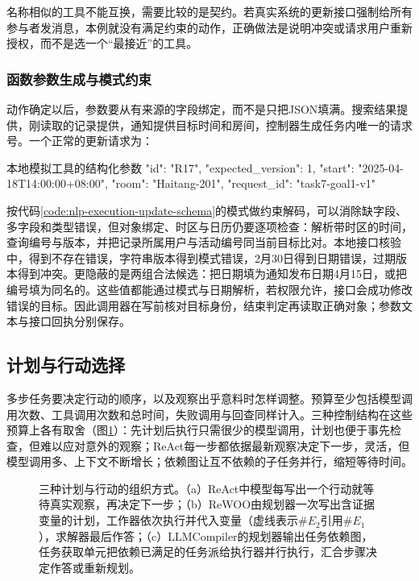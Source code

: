 名称相似的工具不能互换，需要比较的是契约。若真实系统的更新接口强制给所有参与者发消息，本例就没有满足约束的动作，正确做法是说明冲突或请求用户重新授权，而不是选一个“最接近”的工具。

\subsubsection{函数参数生成与模式约束}
\label{sec:nlp-execution-tool-arguments}

动作确定以后，参数要从有来源的字段绑定，而不是只把JSON填满。搜索结果提供，刚读取的记录提供，通知提供目标时间和房间，控制器生成任务内唯一的请求号。一个正常的更新请求为：

\begin{codeblock}[label={code:nlp-execution-tool-request}]{本地模拟工具的结构化参数}
{
  "id": "R17",
  "expected_version": 1,
  "start": "2025-04-18T14:00:00+08:00",
  "room": "Haitang-201",
  "request_id": "task7-goal1-v1"
}
\end{codeblock}

按代码\ref{code:nlp-execution-update-schema}的模式做约束解码，可以消除缺字段、多字段和类型错误，但对象绑定、时区与日历仍要逐项检查：解析带时区的时间，查询编号与版本，并把记录所属用户与活动编号同当前目标比对。本地接口核验中，得到不存在错误，字符串版本得到模式错误，2月30日得到日期错误，过期版本得到冲突。更隐蔽的是两组合法候选：把日期填为通知发布日期4月15日，或把编号填为同名的。这些值都能通过模式与日期解析，若权限允许，接口会成功修改错误的目标。因此调用器在写前核对目标身份，结束判定再读取正确对象；参数文本与接口回执分别保存。

\subsection{计划与行动选择}
\label{sec:nlp-execution-planning}

多步任务要决定行动的顺序，以及观察出乎意料时怎样调整。预算至少包括模型调用次数、工具调用次数和总时间，失败调用与回查同样计入。三种控制结构在这些预算上各有取舍（图\ref{fig:nlp-execution-planning-patterns}）：先计划后执行只需很少的模型调用，计划也便于事先检查，但难以应对意外的观察；ReAct每一步都依据最新观察决定下一步，灵活，但模型调用多、上下文不断增长；依赖图让互不依赖的子任务并行，缩短等待时间。

\begin{figure}[htbp]
  \centering
  
  \caption{三种计划与行动的组织方式。（a）ReAct中模型每写出一个行动就等待真实观察，再决定下一步；（b）ReWOO由规划器一次写出含证据变量的计划，工作器依次执行并代入变量（虚线表示$\#E_2$引用$\#E_1$），求解器最后作答；（c）LLMCompiler的规划器输出任务依赖图，任务获取单元把依赖已满足的任务派给执行器并行执行，汇合步骤决定作答或重新规划。}
  \label{fig:nlp-execution-planning-patterns}
\end{figure}

